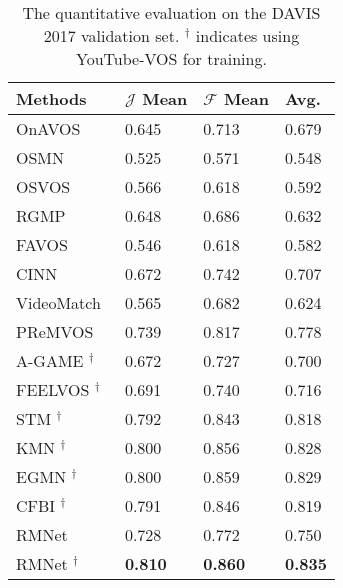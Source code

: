 \documentclass[final]{cvpr}
\begin{document}
\begin{table}
  \caption{The quantitative evaluation on the DAVIS 2017 validation set. $^\dag$ indicates using YouTube-VOS for training.}
  \vspace{.5 mm}
  \begin{tabularx}{\linewidth}{lYYY}
    \toprule
    Methods       & $\mathcal{J}$ Mean & $\mathcal{F}$ Mean
                  & Avg. \\
    \midrule
    OnAVOS~\cite{DBLP:conf/bmvc/VoigtlaenderL17}
                  & 0.645      & 0.713      & 0.679 \\
    OSMN~\cite{DBLP:conf/cvpr/YangWXYK18}
                  & 0.525      & 0.571      & 0.548 \\
    OSVOS~\cite{DBLP:conf/cvpr/CaellesMPLCG17}
                  & 0.566      & 0.618      & 0.592 \\
    RGMP~\cite{DBLP:conf/cvpr/OhLSK18}
                  & 0.648      & 0.686      & 0.632 \\
    FAVOS~\cite{DBLP:conf/cvpr/ChengTHW018}
                  & 0.546      & 0.618      & 0.582 \\
    CINN~\cite{DBLP:conf/cvpr/BaoW018}
                  & 0.672      & 0.742      & 0.707 \\
    VideoMatch~\cite{DBLP:conf/eccv/HuHS18a}
                  & 0.565      & 0.682      & 0.624 \\
    PReMVOS~\cite{DBLP:conf/accv/LuitenVL18}
                  & 0.739      & 0.817      & 0.778 \\
    A-GAME $^\dag$~\cite{DBLP:conf/cvpr/JohnanderDBKF19}
                  & 0.672      & 0.727      & 0.700 \\
    FEELVOS $^\dag$~\cite{DBLP:conf/cvpr/VoigtlaenderCSA19}
                  & 0.691      & 0.740      & 0.716 \\
STM $^\dag$~\cite{DBLP:conf/iccv/OhLXK19}
                  & 0.792      & 0.843      & 0.818 \\
KMN $^\dag$~\cite{DBLP:conf/eccv/SeongHK20}
                  & 0.800      & 0.856      & 0.828 \\
    EGMN $^\dag$~\cite{DBLP:conf/eccv/LuWDZSG20} 
                  & 0.800      & 0.859      & 0.829 \\
CFBI $^\dag$~\cite{DBLP:conf/eccv/YangWY20}
                  & 0.791      & 0.846      & 0.819 \\
    \midrule
    RMNet         & 0.728      & 0.772      & 0.750 \\
    RMNet $^\dag$ 
                  & \bf{0.810} & \bf{0.860} & \bf{0.835} \\
    \bottomrule
  \end{tabularx}
  \label{tab:davis2017-val}
  \vspace{-2 mm}
\end{table}
\end{document}
